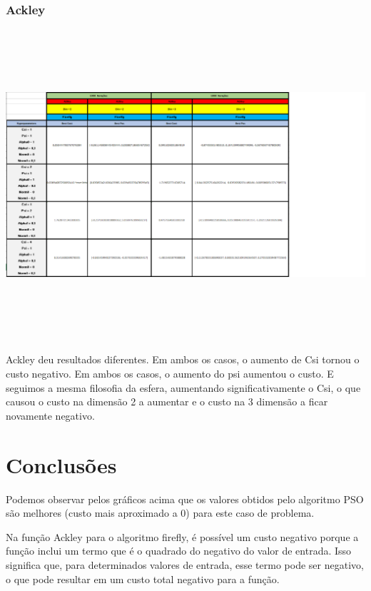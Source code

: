 \documentclass[10pt]{article}
\begin{document}
\subsubsection{Ackley}\label{sec:comp-PSO}
\begin{center}
  \includegraphics[height=11.5cm]{img/Fireflyackley.png}
\end{center}

Ackley deu resultados diferentes. Em  ambos os casos, o aumento 
de Csi tornou o custo negativo. 
Em ambos os casos, o aumento do psi aumentou o custo.
E seguimos a mesma filosofia da esfera, aumentando 
significativamente o Csi, o que causou o custo na dimensão 2 a 
aumentar e o custo na 3 dimensão a ficar novamente negativo.

\newpage

\section{Conclusões}\label{sec:an-da-info-fin-da-org}
Podemos observar pelos gráficos acima que os valores
obtidos pelo algoritmo PSO são melhores 
(custo mais aproximado a 0) para este caso de problema.

Na função Ackley para o algoritmo firefly, é possível um custo
negativo porque a função inclui um termo que é o quadrado do
negativo do valor de entrada. Isso significa que, para determinados
valores de entrada, esse termo pode ser negativo, o que pode resultar
em um custo total negativo para a função.
\end{document}
